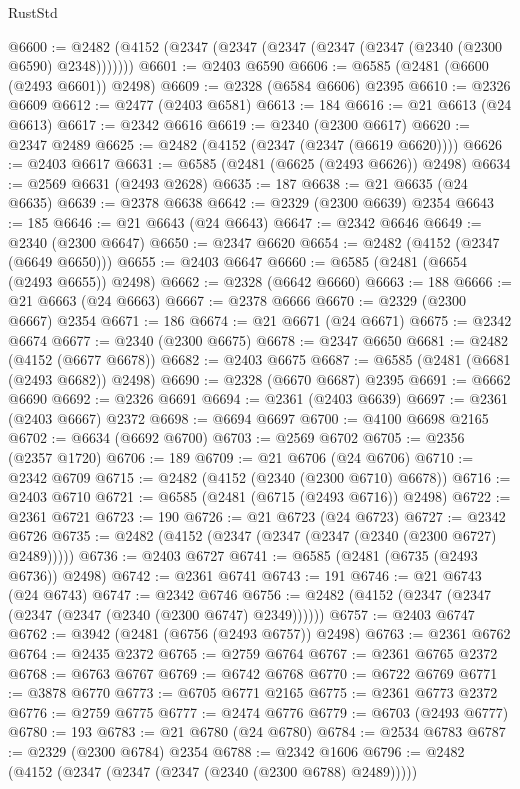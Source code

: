 \begin{lexlean}{RustStd}
\begin{coremodule}
@6600 := @2482 (@4152 (@2347 (@2347 (@2347 (@2347 (@2347 (@2340 (@2300 @6590) @2348)))))))
@6601 := @2403 @6590
@6606 := @6585 (@2481 (@6600 (@2493 @6601)) @2498)
@6609 := @2328 (@6584 @6606) @2395
@6610 := @2326 @6609
@6612 := @2477 (@2403 @6581)
@6613 := 184
@6616 := @21 @6613 (@24 @6613)
@6617 := @2342 @6616
@6619 := @2340 (@2300 @6617)
@6620 := @2347 @2489
@6625 := @2482 (@4152 (@2347 (@2347 (@6619 @6620))))
@6626 := @2403 @6617
@6631 := @6585 (@2481 (@6625 (@2493 @6626)) @2498)
@6634 := @2569 @6631 (@2493 @2628)
@6635 := 187
@6638 := @21 @6635 (@24 @6635)
@6639 := @2378 @6638
@6642 := @2329 (@2300 @6639) @2354
@6643 := 185
@6646 := @21 @6643 (@24 @6643)
@6647 := @2342 @6646
@6649 := @2340 (@2300 @6647)
@6650 := @2347 @6620
@6654 := @2482 (@4152 (@2347 (@6649 @6650)))
@6655 := @2403 @6647
@6660 := @6585 (@2481 (@6654 (@2493 @6655)) @2498)
@6662 := @2328 (@6642 @6660)
@6663 := 188
@6666 := @21 @6663 (@24 @6663)
@6667 := @2378 @6666
@6670 := @2329 (@2300 @6667) @2354
@6671 := 186
@6674 := @21 @6671 (@24 @6671)
@6675 := @2342 @6674
@6677 := @2340 (@2300 @6675)
@6678 := @2347 @6650
@6681 := @2482 (@4152 (@6677 @6678))
@6682 := @2403 @6675
@6687 := @6585 (@2481 (@6681 (@2493 @6682)) @2498)
@6690 := @2328 (@6670 @6687) @2395
@6691 := @6662 @6690
@6692 := @2326 @6691
@6694 := @2361 (@2403 @6639)
@6697 := @2361 (@2403 @6667) @2372
@6698 := @6694 @6697
@6700 := @4100 @6698 @2165
@6702 := @6634 (@6692 @6700)
@6703 := @2569 @6702
@6705 := @2356 (@2357 @1720)
@6706 := 189
@6709 := @21 @6706 (@24 @6706)
@6710 := @2342 @6709
@6715 := @2482 (@4152 (@2340 (@2300 @6710) @6678))
@6716 := @2403 @6710
@6721 := @6585 (@2481 (@6715 (@2493 @6716)) @2498)
@6722 := @2361 @6721
@6723 := 190
@6726 := @21 @6723 (@24 @6723)
@6727 := @2342 @6726
@6735 := @2482 (@4152 (@2347 (@2347 (@2347 (@2340 (@2300 @6727) @2489)))))
@6736 := @2403 @6727
@6741 := @6585 (@2481 (@6735 (@2493 @6736)) @2498)
@6742 := @2361 @6741
@6743 := 191
@6746 := @21 @6743 (@24 @6743)
@6747 := @2342 @6746
@6756 := @2482 (@4152 (@2347 (@2347 (@2347 (@2347 (@2340 (@2300 @6747) @2349))))))
@6757 := @2403 @6747
@6762 := @3942 (@2481 (@6756 (@2493 @6757)) @2498)
@6763 := @2361 @6762
@6764 := @2435 @2372
@6765 := @2759 @6764
@6767 := @2361 @6765 @2372
@6768 := @6763 @6767
@6769 := @6742 @6768
@6770 := @6722 @6769
@6771 := @3878 @6770
@6773 := @6705 @6771 @2165
@6775 := @2361 @6773 @2372
@6776 := @2759 @6775
@6777 := @2474 @6776
@6779 := @6703 (@2493 @6777)
@6780 := 193
@6783 := @21 @6780 (@24 @6780)
@6784 := @2534 @6783
@6787 := @2329 (@2300 @6784) @2354
@6788 := @2342 @1606
@6796 := @2482 (@4152 (@2347 (@2347 (@2347 (@2340 (@2300 @6788) @2489)))))

\end{coremodule}
\end{lexlean}
